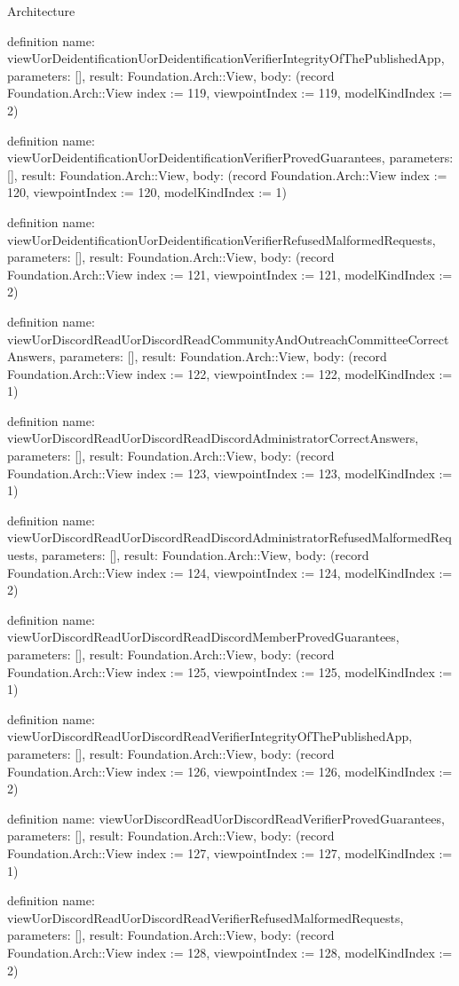 \begin{lexlean}{Architecture}
\begin{semanticmodule}
definition{
  name: viewUorDeidentificationUorDeidentificationVerifierIntegrityOfThePublishedApp,
  parameters: [],
  result: Foundation.Arch::View,
  body: (record Foundation.Arch::View {index := 119, viewpointIndex := 119, modelKindIndex := 2})
}

definition{
  name: viewUorDeidentificationUorDeidentificationVerifierProvedGuarantees,
  parameters: [],
  result: Foundation.Arch::View,
  body: (record Foundation.Arch::View {index := 120, viewpointIndex := 120, modelKindIndex := 1})
}

definition{
  name: viewUorDeidentificationUorDeidentificationVerifierRefusedMalformedRequests,
  parameters: [],
  result: Foundation.Arch::View,
  body: (record Foundation.Arch::View {index := 121, viewpointIndex := 121, modelKindIndex := 2})
}

definition{
  name: viewUorDiscordReadUorDiscordReadCommunityAndOutreachCommitteeCorrectAnswers,
  parameters: [],
  result: Foundation.Arch::View,
  body: (record Foundation.Arch::View {index := 122, viewpointIndex := 122, modelKindIndex := 1})
}

definition{
  name: viewUorDiscordReadUorDiscordReadDiscordAdministratorCorrectAnswers,
  parameters: [],
  result: Foundation.Arch::View,
  body: (record Foundation.Arch::View {index := 123, viewpointIndex := 123, modelKindIndex := 1})
}

definition{
  name: viewUorDiscordReadUorDiscordReadDiscordAdministratorRefusedMalformedRequests,
  parameters: [],
  result: Foundation.Arch::View,
  body: (record Foundation.Arch::View {index := 124, viewpointIndex := 124, modelKindIndex := 2})
}

definition{
  name: viewUorDiscordReadUorDiscordReadDiscordMemberProvedGuarantees,
  parameters: [],
  result: Foundation.Arch::View,
  body: (record Foundation.Arch::View {index := 125, viewpointIndex := 125, modelKindIndex := 1})
}

definition{
  name: viewUorDiscordReadUorDiscordReadVerifierIntegrityOfThePublishedApp,
  parameters: [],
  result: Foundation.Arch::View,
  body: (record Foundation.Arch::View {index := 126, viewpointIndex := 126, modelKindIndex := 2})
}

definition{
  name: viewUorDiscordReadUorDiscordReadVerifierProvedGuarantees,
  parameters: [],
  result: Foundation.Arch::View,
  body: (record Foundation.Arch::View {index := 127, viewpointIndex := 127, modelKindIndex := 1})
}

definition{
  name: viewUorDiscordReadUorDiscordReadVerifierRefusedMalformedRequests,
  parameters: [],
  result: Foundation.Arch::View,
  body: (record Foundation.Arch::View {index := 128, viewpointIndex := 128, modelKindIndex := 2})
}


\end{semanticmodule}
\end{lexlean}

